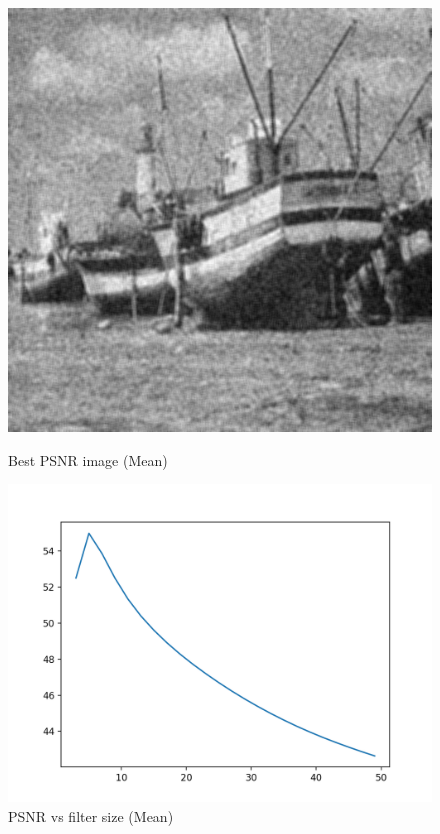 \documentclass{article}
\begin{document}
    \begin{figure}[!htb]
      \includegraphics[scale=0.3]{./basic_denoising/boat/average_best_gaussian.png}
      \caption{Best PSNR image (Mean)}
    \endminipage \hfill
      \includegraphics[scale=.45]{./basic_denoising/boat/average_psnr_gaussian.png}
      \caption{PSNR vs filter size (Mean)}
    \endminipage
    \end{figure}
    
\end{document}
